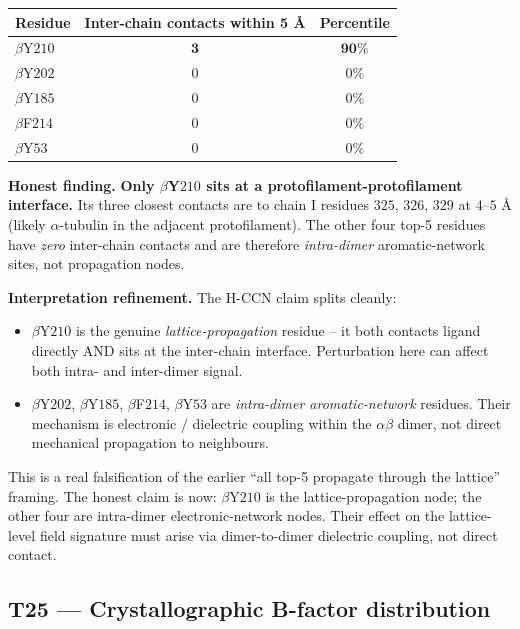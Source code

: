 \documentclass[11pt,a4paper]{article}
\begin{document}
\begin{center}\small
\begin{tabular}{lcc}\toprule
Residue & Inter-chain contacts within 5 \AA & Percentile \\\midrule
$\beta$Y$210$ & $\mathbf{3}$ & $\mathbf{90\%}$ \\
$\beta$Y$202$ & $0$ & $0\%$ \\
$\beta$Y$185$ & $0$ & $0\%$ \\
$\beta$F$214$ & $0$ & $0\%$ \\
$\beta$Y$53$  & $0$ & $0\%$ \\
\bottomrule\end{tabular}
\end{center}

\textbf{Honest finding.} \textbf{Only $\beta$Y$210$ sits at a
protofilament-protofilament interface.} Its three closest contacts
are to chain I residues $325$, $326$, $329$ at $4$--$5$ \AA{} (likely
$\alpha$-tubulin in the adjacent protofilament). The other four top-5
residues have \emph{zero} inter-chain contacts and are therefore
\emph{intra-dimer} aromatic-network sites, not propagation nodes.

\textbf{Interpretation refinement.} The H-CCN claim splits cleanly:

\begin{itemize}\itemsep0pt
  \item $\beta$Y$210$ is the genuine \emph{lattice-propagation} residue
    -- it both contacts ligand directly AND sits at the inter-chain
    interface. Perturbation here can affect both intra- and inter-dimer
    signal.
  \item $\beta$Y$202$, $\beta$Y$185$, $\beta$F$214$, $\beta$Y$53$ are
    \emph{intra-dimer aromatic-network} residues. Their mechanism is
    electronic / dielectric coupling within the $\alpha\beta$ dimer,
    not direct mechanical propagation to neighbours.
\end{itemize}

This is a real falsification of the earlier ``all top-5 propagate
through the lattice'' framing. The honest claim is now: $\beta$Y$210$ is
the lattice-propagation node; the other four are intra-dimer
electronic-network nodes. Their effect on the lattice-level field
signature must arise via dimer-to-dimer dielectric coupling, not
direct contact.

\subsection{\textsf{T25} --- Crystallographic B-factor distribution}\label{ssec:t25}
\end{document}

